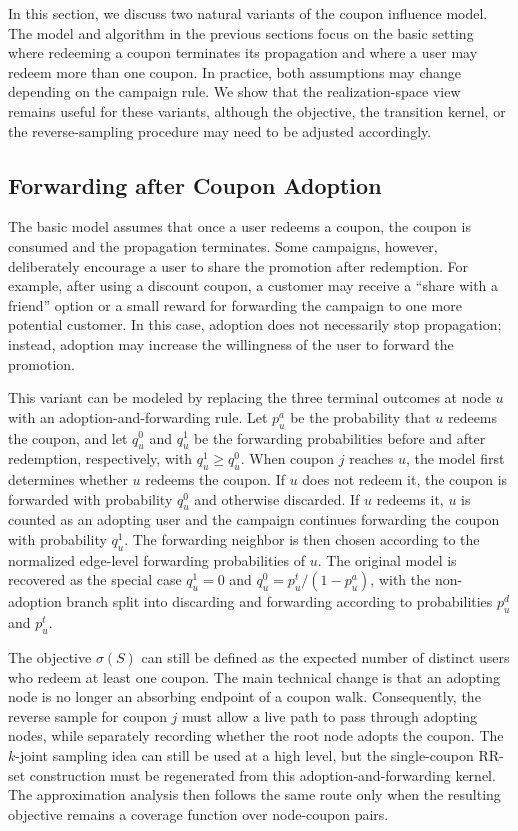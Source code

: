 \documentclass[sigconf]{acmart}
\begin{document}
In this section, we discuss two natural variants of the coupon influence
model.
The model and algorithm in the previous sections focus on the basic
setting where redeeming a coupon terminates its propagation and where a
user may redeem more than one coupon.
In practice, both assumptions may change depending on the campaign rule.
We show that the realization-space view remains useful for these variants,
although the objective, the transition kernel, or the reverse-sampling
procedure may need to be adjusted accordingly.

\subsection{Forwarding after Coupon Adoption}
\label{sec:variant-adopt-forward}

The basic model assumes that once a user redeems a coupon, the coupon is
consumed and the propagation terminates.
Some campaigns, however, deliberately encourage a user to share the
promotion after redemption.
For example, after using a discount coupon, a customer may receive a
``share with a friend'' option or a small reward for forwarding the
campaign to one more potential customer.
In this case, adoption does not necessarily stop propagation; instead,
adoption may increase the willingness of the user to forward the
promotion.

This variant can be modeled by replacing the three terminal outcomes at
node $u$ with an adoption-and-forwarding rule.
Let $p_u^a$ be the probability that $u$ redeems the coupon, and let
$q_u^0$ and $q_u^1$ be the forwarding probabilities before and after
redemption, respectively, with $q_u^1\geq q_u^0$.
When coupon $j$ reaches $u$, the model first determines whether $u$
redeems the coupon.
If $u$ does not redeem it, the coupon is forwarded with probability
$q_u^0$ and otherwise discarded.
If $u$ redeems it, $u$ is counted as an adopting user and the campaign
continues forwarding the coupon with probability $q_u^1$.
The forwarding neighbor is then chosen according to the normalized
edge-level forwarding probabilities of $u$.
The original model is recovered as the special case $q_u^1=0$ and
$q_u^0=p_u^t/(1-p_u^a)$, with the non-adoption branch split into
discarding and forwarding according to probabilities $p_u^d$ and
$p_u^t$.

The objective $\sigma(S)$ can still be defined as the expected number of
distinct users who redeem at least one coupon.
The main technical change is that an adopting node is no longer an
absorbing endpoint of a coupon walk.
Consequently, the reverse sample for coupon $j$ must allow a live path
to pass through adopting nodes, while separately recording whether the
root node adopts the coupon.
The $k$-joint sampling idea can still be used at a high level, but the
single-coupon RR-set construction must be regenerated from this
adoption-and-forwarding kernel.
The approximation analysis then follows the same route only when the
resulting objective remains a coverage function over node-coupon pairs.
\end{document}
